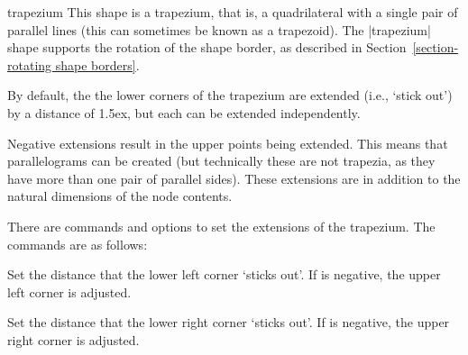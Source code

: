 \begin{shape}{trapezium}
	This shape is a trapezium, that is, a quadrilateral with a single
	pair of parallel lines (this can sometimes be known as a trapezoid).
	The |trapezium| shape supports the rotation of the shape border, as 
	described in Section~\ref{section-rotating shape borders}. 
   
   By default, the the lower corners of the trapezium are extended 
	(i.e., `stick out') by a distance of 1.5ex, but each can be extended 
	independently.	

	
\begin{codeexample}[]
\end{codeexample}

   Negative extensions result in the upper points being extended. This
   means that parallelograms can be created (but technically these are
   not trapezia, as they have more than one pair of parallel sides).
   These extensions are in addition to the natural dimensions of the
   node contents.
   
\begin{codeexample}[]
\end{codeexample}

	There are \pgfname{} commands and \tikzname{} options to set the 
  	extensions of the trapezium. The \pgfname{} commands are as follows:
	
	\begin{command}{\pgftrapeziumleftextension{}}
    Set the distance that the lower left corner `sticks out'. If 
     is negative, the upper left corner is adjusted.
   \end{command}
   
   \begin{command}{\pgftrapeziumrightextension{}}
    Set the distance that the lower right corner `sticks out'. If 
     is negative, the upper right corner is adjusted.
   \end{command}
   

\end{shape}
